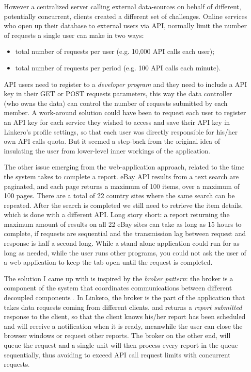 However a centralized server calling external data-sources on behalf of
different, potentially concurrent, clients created a different set of
challenges. Online services who open up their database to external users via
API, normally limit the number of requests a single user can make in two ways:
\begin{itemize}
  \item total number of requests per user (e.g. 10,000 API calls each user);
  \item total number of requests per period (e.g. 100 API calls each minute).
\end{itemize}

API users need to register to a \emph{developer program} and they need to
include a API key in their GET or POST requests parameters, this way the data
controller (who owns the data) can control the number of requests submitted by
each member. A work-around solution could have been to request each user to
register an API key for each service they wished to access and save their API key in
Linkero's profile settings, so that each user was directly responsible for
his/her own API calls quota. But it seemed a step-back from the original idea of
insulating the user from lower-level inner workings of the application.

The other issue emerging from the web-application approach, related to the time
the system takes to complete a report. eBay API results from a text search
are paginated, and each page returns a maximum of 100 items, over a maximum of
100 pages. There are a total of 22 country sites where the same search can be
repeated. After the search is completed we still need to retrieve the item
details, which is done with a different API. Long story short: a report
returning the maximum amount of results on all 22 eBay sites can take as long
as 15 hours to complete, if requests are sequential and the transmission lag
between request and response is half a second long. While a stand alone
application could run for as long as needed, while the user runs other programs,
you could not ask the user of a web application to keep the tab open until the
request is completed.

The solution I came up with is inspired by the \emph{broker pattern}: the broker
is a component of the system that coordinates communications between different
decoupled components \cite{JB00}. In Linkero, the broker is the part of the
application that takes data requests coming from different clients, and returns
a \emph{report submitted} response to the client, so that the client knows
his/her report has been scheduled and will receive a notification when it is
ready, meanwhile the user can close the browser windows or request other
reports. The broker on the other end, will queue the request and a single unit
will then process every report in the queue sequentially, thus avoiding to
exceed API call request limits with concurrent requests.

